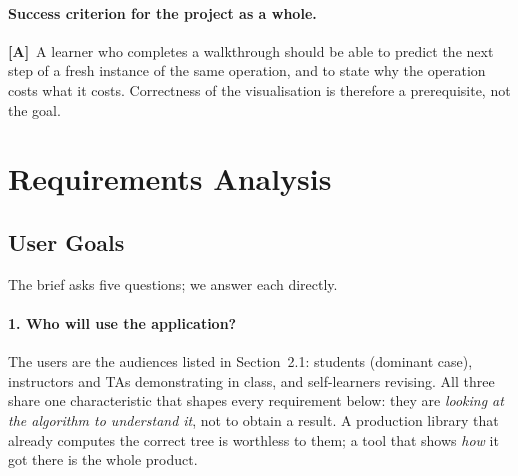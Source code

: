 \documentclass[11pt,a4paper]{article}
\newcommand{\A}{\textcolor{asmc}{\textbf{[A]}}}     %
\begin{document}
\paragraph{Success criterion for the project as a whole.} \A\ A learner who completes a
walkthrough should be able to predict the next step of a fresh instance of the same
operation, and to state why the operation costs what it costs. Correctness of the
visualisation is therefore a prerequisite, not the goal.

\section{Requirements Analysis}

\subsection{User Goals}

The brief asks five questions; we answer each directly.

\paragraph{1. Who will use the application?}
The users are the audiences listed in Section~2.1: students (dominant case), instructors
and TAs demonstrating in class, and self-learners revising. All three share one
characteristic that shapes every requirement below: they are \emph{looking at the
algorithm to understand it}, not to obtain a result. A production library that already
computes the correct tree is worthless to them; a tool that shows \emph{how} it got there
is the whole product.
\end{document}

